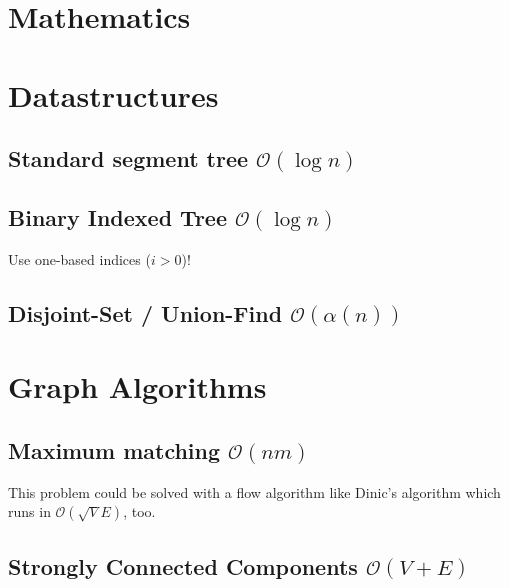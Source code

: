 \documentclass{article}
\begin{document}
\section{Mathematics}



\section{Datastructures}
\subsection{Standard segment tree $\mathcal{O}(\log n)$}



\subsection{Binary Indexed Tree $\mathcal{O}(\log n)$}

Use one-based indices ($i > 0$)!



\subsection{Disjoint-Set / Union-Find $\mathcal{O}(\alpha (n))$}



\section{Graph Algorithms}
\subsection{Maximum matching $\mathcal{O}(n m)$}

This problem could be solved with a flow algorithm like Dinic's algorithm which runs in $\mathcal{O} (\sqrt{V} E)$, too.



\subsection{Strongly Connected Components $\mathcal{O}(V + E)$}


\end{document}
